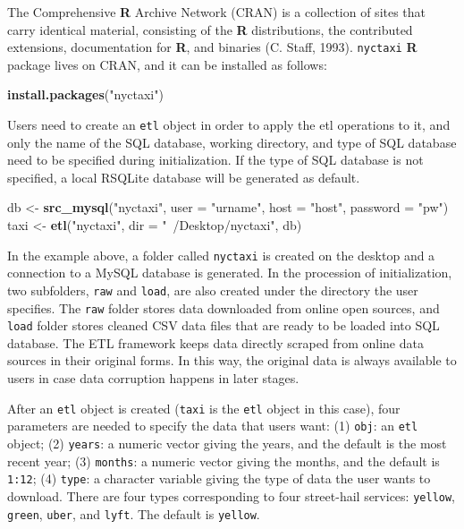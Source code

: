 \documentclass[12pt,twoside]{reedthesis}
\newenvironment{Shaded}{\begin{snugshade}}{\end{snugshade}}
\newcommand{\KeywordTok}[1]{\textcolor[rgb]{0.13,0.29,0.53}{\textbf{#1}}}
\newcommand{\DataTypeTok}[1]{\textcolor[rgb]{0.13,0.29,0.53}{#1}}
\newcommand{\StringTok}[1]{\textcolor[rgb]{0.31,0.60,0.02}{#1}}
\newcommand{\NormalTok}[1]{#1}
\theoremstyle{definition}
\theoremstyle{definition}
\theoremstyle{definition}
\theoremstyle{remark}
\begin{document}
The Comprehensive \textbf{R} Archive Network (CRAN) is a collection of
sites that carry identical material, consisting of the \textbf{R}
distributions, the contributed extensions, documentation for \textbf{R},
and binaries (C. Staff, 1993). \texttt{nyctaxi} \textbf{R} package lives
on CRAN, and it can be installed as follows:
\begin{Shaded}
\begin{Highlighting}[]
\KeywordTok{install.packages}\NormalTok{(}\StringTok{"nyctaxi"}\NormalTok{)}
\end{Highlighting}
\end{Shaded}
Users need to create an \texttt{etl} object in order to apply the etl
operations to it, and only the name of the SQL database, working
directory, and type of SQL database need to be specified during
initialization. If the type of SQL database is not specified, a local
RSQLite database will be generated as default.
\begin{Shaded}
\begin{Highlighting}[]
\NormalTok{db <-}\StringTok{ }\KeywordTok{src_mysql}\NormalTok{(}\StringTok{"nyctaxi"}\NormalTok{, }\DataTypeTok{user =} \StringTok{"urname"}\NormalTok{, }\DataTypeTok{host =} \StringTok{"host"}\NormalTok{, }
                \DataTypeTok{password =} \StringTok{"pw"}\NormalTok{)}
\NormalTok{taxi <-}\StringTok{ }\KeywordTok{etl}\NormalTok{(}\StringTok{"nyctaxi"}\NormalTok{, }\DataTypeTok{dir =} \StringTok{"~/Desktop/nyctaxi"}\NormalTok{, db)}
\end{Highlighting}
\end{Shaded}
In the example above, a folder called \texttt{nyctaxi} is created on the
desktop and a connection to a MySQL database is generated. In the
procession of initialization, two subfolders, \texttt{raw} and
\texttt{load}, are also created under the directory the user specifies.
The \texttt{raw} folder stores data downloaded from online open sources,
and \texttt{load} folder stores cleaned CSV data files that are ready to
be loaded into SQL database. The ETL framework keeps data directly
scraped from online data sources in their original forms. In this way,
the original data is always available to users in case data corruption
happens in later stages.

After an \texttt{etl} object is created (\texttt{taxi} is the
\texttt{etl} object in this case), four parameters are needed to specify
the data that users want: (1) \texttt{obj}: an \texttt{etl} object; (2)
\texttt{years}: a numeric vector giving the years, and the default is
the most recent year; (3) \texttt{months}: a numeric vector giving the
months, and the default is \texttt{1:12}; (4) \texttt{type}: a character
variable giving the type of data the user wants to download. There are
four types corresponding to four street-hail services: \texttt{yellow},
\texttt{green}, \texttt{uber}, and \texttt{lyft}. The default is
\texttt{yellow}.
\end{document}
